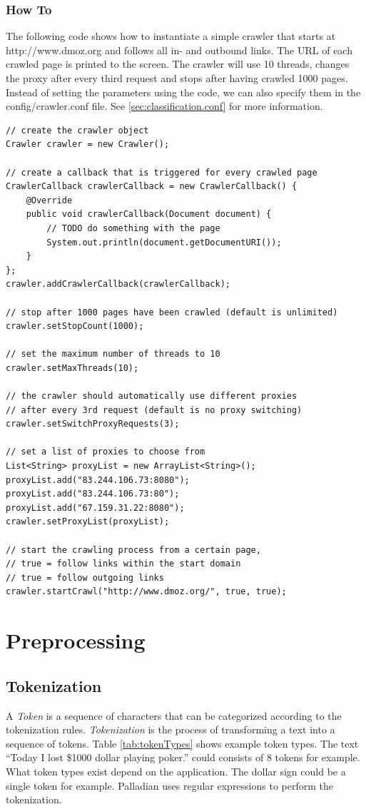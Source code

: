 \documentclass[a4paper,twoside]{book}      %
\begin{document}
\subsubsection{How To}
The following code shows how to instantiate a simple crawler that starts at http://www.dmoz.org and follows all in- and outbound links. The URL of each crawled page is printed to the screen. The crawler will use 10 threads, changes the proxy after every third request and stops after having crawled 1000 pages. Instead of setting the parameters using the code, we can also specify them in the config/crawler.conf file. See \ref{sec:classification.conf} for more information.

\begin{codelisting}
\begin{lstlisting}[frame=tb]
// create the crawler object
Crawler crawler = new Crawler();

// create a callback that is triggered for every crawled page
CrawlerCallback crawlerCallback = new CrawlerCallback() {
	@Override
	public void crawlerCallback(Document document) {
		// TODO do something with the page
		System.out.println(document.getDocumentURI());
	}
};
crawler.addCrawlerCallback(crawlerCallback);

// stop after 1000 pages have been crawled (default is unlimited)
crawler.setStopCount(1000);

// set the maximum number of threads to 10
crawler.setMaxThreads(10);

// the crawler should automatically use different proxies
// after every 3rd request (default is no proxy switching)
crawler.setSwitchProxyRequests(3);

// set a list of proxies to choose from
List<String> proxyList = new ArrayList<String>();
proxyList.add("83.244.106.73:8080");
proxyList.add("83.244.106.73:80");
proxyList.add("67.159.31.22:8080");
crawler.setProxyList(proxyList);

// start the crawling process from a certain page,
// true = follow links within the start domain
// true = follow outgoing links
crawler.startCrawl("http://www.dmoz.org/", true, true);
\end{lstlisting}
\end{codelisting}

\section{Preprocessing}
\subsection{Tokenization}
A \textit{Token} is a sequence of characters that can be categorized according to the tokenization rules. \textit{Tokenization} is the process of transforming a text into a sequence of tokens. Table \ref{tab:tokenTypes} shows example token types. The text ``Today I lost \$1000 dollar playing poker.'' could consists of 8 tokens for example. What token types exist depend on the application. The dollar sign could be a single token for example. Palladian uses regular expressions to perform the tokenization.
\end{document}
